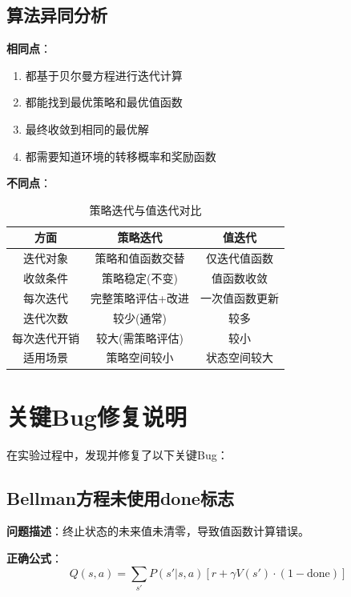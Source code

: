 \documentclass[12pt,a4paper]{article}
\begin{document}
\subsection{算法异同分析}

\textbf{相同点}：
\begin{enumerate}[itemsep=0pt]
    \item 都基于贝尔曼方程进行迭代计算
    \item 都能找到最优策略和最优值函数
    \item 最终收敛到相同的最优解
    \item 都需要知道环境的转移概率和奖励函数
\end{enumerate}

\textbf{不同点}：

\begin{table}[H]
\centering
\caption{策略迭代与值迭代对比}
\label{tab:comparison}
\begin{tabular}{ccc}
\toprule
\textbf{方面} & \textbf{策略迭代} & \textbf{值迭代} \\
\midrule
迭代对象 & 策略和值函数交替 & 仅迭代值函数 \\
收敛条件 & 策略稳定(不变) & 值函数收敛 \\
每次迭代 & 完整策略评估+改进 & 一次值函数更新 \\
迭代次数 & 较少(通常) & 较多 \\
每次迭代开销 & 较大(需策略评估) & 较小 \\
适用场景 & 策略空间较小 & 状态空间较大 \\
\bottomrule
\end{tabular}
\end{table}

\section{关键Bug修复说明}

在实验过程中，发现并修复了以下关键Bug：

\subsection{Bellman方程未使用done标志}

\textbf{问题描述}：终止状态的未来值未清零，导致值函数计算错误。

\textbf{正确公式}：
\begin{equation}
Q(s,a) = \sum_{s'} P(s'|s,a)[r + \gamma V(s') \cdot (1-\text{done})]
\end{equation}
\end{document}

